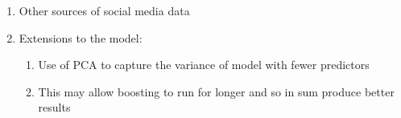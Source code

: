 \documentclass{article}
\begin{document}
\begin{enumerate}
\item Other sources of social media data
\label{sec-9-1}

\item Extensions to the model:
\label{sec-9-2}

\begin{enumerate}
\item Use of PCA to capture the variance of model with fewer predictors
\label{sec-9-2-1}

\item This may allow boosting to run for longer and so in sum produce better results
\label{sec-9-2-2}
\end{enumerate}
\end{enumerate}
\end{document}
